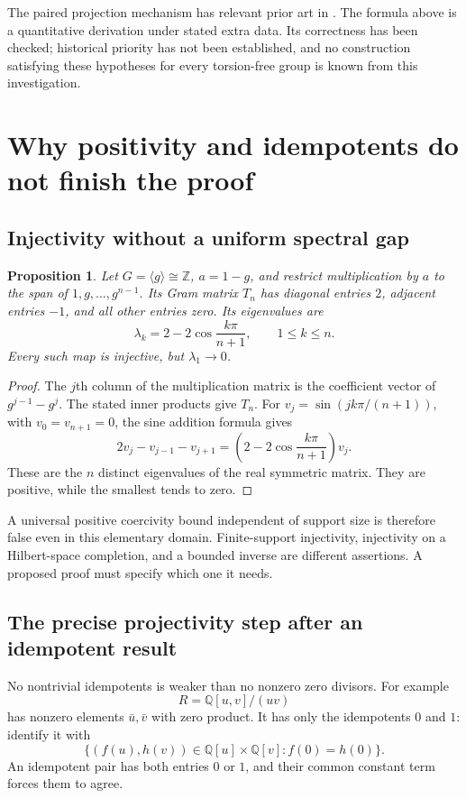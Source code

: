\documentclass[11pt,a4paper,oneside]{report}
\newtheorem{proposition}[theorem]{Proposition}
\theoremstyle{definition}
\theoremstyle{remark}
\newcommand{\Q}{\mathbb Q}
\newcommand{\Z}{\mathbb Z}
\begin{document}
The paired projection mechanism has relevant prior art in \cite{B:MD}.
The formula above is a quantitative derivation under stated extra data.
Its correctness has been checked; historical priority has not been
established, and no construction satisfying these hypotheses for every
torsion-free group is known from this investigation.

\section{Why positivity and idempotents do not finish the proof}

\subsection{Injectivity without a uniform spectral gap}\label{M01:sec:spectralgap}

\begin{proposition}\label{M01:prop:gap}
Let $G=\langle g\rangle\cong\Z$, $a=1-g$, and restrict multiplication
by $a$ to the span of $1,g,\ldots,g^{n-1}$. Its Gram matrix $T_n$
has diagonal entries $2$, adjacent entries $-1$, and all other entries
zero. Its eigenvalues are
\[
\lambda_k=2-2\cos\frac{k\pi}{n+1},\qquad1\le k\le n.
\]
Every such map is injective, but $\lambda_1\to0$.
\end{proposition}
\begin{proof}
The $j$th column of the multiplication matrix is the coefficient vector
of $g^{j-1}-g^j$. The stated inner products give $T_n$.
For $v_j=\sin(jk\pi/(n+1))$, with $v_0=v_{n+1}=0$, the sine addition
formula gives
\[
2v_j-v_{j-1}-v_{j+1}
=\left(2-2\cos\frac{k\pi}{n+1}\right)v_j.
\]
These are the $n$ distinct eigenvalues of the real symmetric matrix.
They are positive, while the smallest tends to zero.
\end{proof}

A universal positive coercivity bound independent of support size is
therefore false even in this elementary domain. Finite-support injectivity,
injectivity on a Hilbert-space completion, and a bounded inverse are
different assertions. A proposed proof must specify which one it needs.

\subsection{The precise projectivity step after an idempotent result}

No nontrivial idempotents is weaker than no nonzero zero divisors.
For example
\[
R=\Q[u,v]/(uv)
\]
has nonzero elements $\bar u,\bar v$ with zero product. It has only the
idempotents $0$ and $1$: identify it with
\[
\{(f(u),h(v))\in\Q[u]\times\Q[v]:f(0)=h(0)\}.
\]
An idempotent pair has both entries $0$ or $1$, and their common
constant term forces them to agree.
\end{document}
